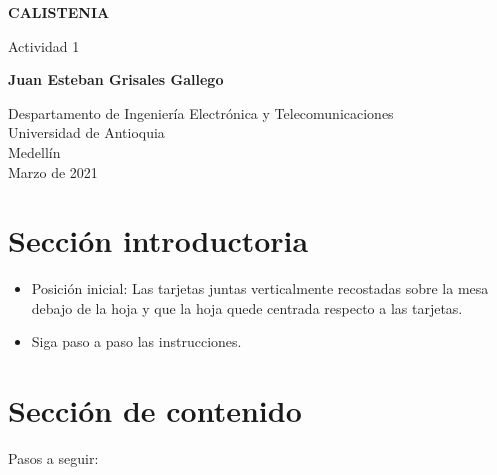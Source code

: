 \documentclass{article}
\begin{document}
\begin{titlepage}
    \begin{center}
        \vspace*{1cm}
            
        \Huge
        \textbf{CALISTENIA}
            
        \vspace{0.5cm}
        \LARGE
        Actividad 1
            
        \vspace{1.5cm}
            
        \textbf{Juan Esteban Grisales Gallego}
            
        \vfill
            
        \vspace{0.8cm}
            
        \Large
        Despartamento de Ingeniería Electrónica y Telecomunicaciones\\
        Universidad de Antioquia\\
        Medellín\\
        Marzo de 2021
            
    \end{center}
\end{titlepage}

\tableofcontents
\newpage
\section{Sección introductoria}\label{intro}


\begin{itemize}
    \item Posición inicial: Las tarjetas juntas verticalmente recostadas sobre la        mesa   debajo de la hoja y que la hoja quede centrada respecto a las tarjetas.
    \item Siga paso a paso las instrucciones.

\end{itemize}

\section{Sección de contenido} \label{contenido}



Pasos a seguir:
\end{document}
